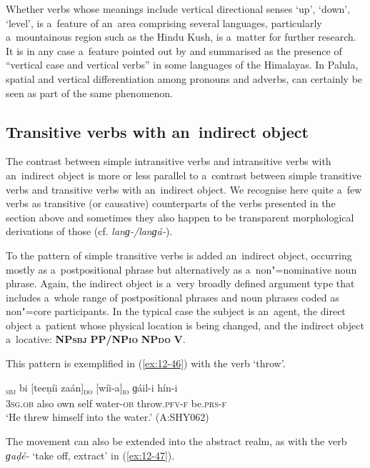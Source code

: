 Whether verbs whose meanings include vertical directional senses `up', `down', `level', is a~feature of an~area comprising several languages, particularly a~mountainous region such as the Hindu Kush, is a~matter for further research. It is in any case a~feature pointed out by \citet[9]{noonan2003} and summarised as the presence of ``vertical case and vertical verbs'' in some languages of the Himalayas. In Palula, spatial and vertical differentiation among pronouns and adverbs, can certainly be seen as part of the same phenomenon. 


\subsection{Transitive verbs with an~indirect object}
\label{subsec:12-2-5}


The contrast between simple intransitive verbs and intransitive verbs with an~indirect object is more or less parallel to a~contrast between simple transitive verbs and transitive verbs with an~indirect object. We recognise here quite a~few verbs as transitive (or causative) counterparts of the verbs presented in the section above and sometimes they also happen to be transparent morphological derivations of those (cf. \textit{lanɡ-/lanɡá-}). 


To the pattern of simple transitive verbs is added an~indirect object, occurring mostly as a~postpositional phrase but alternatively as a~non"=nominative noun phrase. Again, the indirect object is a~very broadly defined argument type that includes a~whole range of postpositional phrases and noun phrases coded as non"=core participants. In the typical case the subject is an~agent, the direct object a~patient whose physical location is being changed, and the indirect object a~locative: \textbf{NP\textsc{sbj}} \textbf{PP/NP\textsc{io}} \textbf{NP\textsc{do}} \textbf{V}. 


This pattern is exemplified in (\ref{ex:12-46}) with the verb `throw'.

\begin{exe}
\ex
\label{ex:12-46}
\gll [tíi]\textsubscript{\textsc{sbj}} bi [teeṇíi zaán]\textsubscript{\textsc{do}} [wíi-a]\textsubscript{\textsc{io}} ɡáil-i hín-i \\
\textsc{3sg.ob} also own self water-\textsc{ob} throw.\textsc{pfv-f} be.\textsc{prs-f} \\
\glt `He threw himself into the water.' (A:SHY062)
\end{exe}

The movement can also be extended into the abstract realm, as with the verb \textit{ɡaḍé-} `take off, extract' in (\ref{ex:12-47}).


